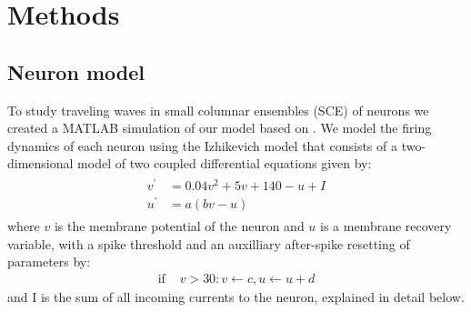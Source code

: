 
\chapter{Methods}

\section{Neuron model}
To study traveling waves in small columnar ensembles (SCE) of neurons we created a MATLAB simulation of our model based on \citet{izhikevich2003}.
We model the firing dynamics of each neuron using the Izhikevich model \citep{izhikevich2003} that consists of a two-dimensional model of two coupled differential equations given by:
\begin{align}
 \begin{split}
  v^\prime &= 0.04v^2+5v+140-u+I \label{eq:neuron_v} \\
  u^\prime &= a(bv-u)
 \end{split}
\end{align}
where $v$ is the membrane potential of the neuron and $u$ is a membrane recovery variable, with a spike threshold and an auxilliary after-spike resetting of parameters by:
\begin{align}
  \text{if } &v>30: v\leftarrow c, u\leftarrow u+d
\end{align}
and I is the sum of all incoming currents to the neuron, explained in detail below. 

